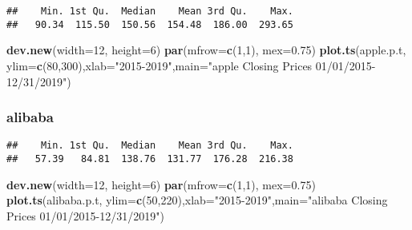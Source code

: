 \documentclass[]{article}
\newenvironment{Shaded}{\begin{snugshade}}{\end{snugshade}}
\newcommand{\KeywordTok}[1]{\textcolor[rgb]{0.13,0.29,0.53}{\textbf{#1}}}
\newcommand{\DataTypeTok}[1]{\textcolor[rgb]{0.13,0.29,0.53}{#1}}
\newcommand{\DecValTok}[1]{\textcolor[rgb]{0.00,0.00,0.81}{#1}}
\newcommand{\FloatTok}[1]{\textcolor[rgb]{0.00,0.00,0.81}{#1}}
\newcommand{\StringTok}[1]{\textcolor[rgb]{0.31,0.60,0.02}{#1}}
\newcommand{\OperatorTok}[1]{\textcolor[rgb]{0.81,0.36,0.00}{\textbf{#1}}}
\newcommand{\NormalTok}[1]{#1}
\begin{document}
\begin{verbatim}
##    Min. 1st Qu.  Median    Mean 3rd Qu.    Max. 
##   90.34  115.50  150.56  154.48  186.00  293.65
\end{verbatim}

\begin{Shaded}
\begin{Highlighting}[]
\KeywordTok{dev.new}\NormalTok{(}\DataTypeTok{width=}\DecValTok{12}\NormalTok{, }\DataTypeTok{height=}\DecValTok{6}\NormalTok{)}
\KeywordTok{par}\NormalTok{(}\DataTypeTok{mfrow=}\KeywordTok{c}\NormalTok{(}\DecValTok{1}\NormalTok{,}\DecValTok{1}\NormalTok{), }\DataTypeTok{mex=}\FloatTok{0.75}\NormalTok{)}
\KeywordTok{plot.ts}\NormalTok{(apple.p.t, }\DataTypeTok{ylim=}\KeywordTok{c}\NormalTok{(}\DecValTok{80}\NormalTok{,}\DecValTok{300}\NormalTok{),}\DataTypeTok{xlab=}\StringTok{"2015-2019"}\NormalTok{,}\DataTypeTok{main=}\StringTok{"apple Closing Prices 01/01/2015-12/31/2019"}\NormalTok{)}
\end{Highlighting}
\end{Shaded}

\subsubsection{alibaba}\label{alibaba}

\begin{Shaded}
\end{Shaded}

\begin{verbatim}
##    Min. 1st Qu.  Median    Mean 3rd Qu.    Max. 
##   57.39   84.81  138.76  131.77  176.28  216.38
\end{verbatim}

\begin{Shaded}
\begin{Highlighting}[]
\KeywordTok{dev.new}\NormalTok{(}\DataTypeTok{width=}\DecValTok{12}\NormalTok{, }\DataTypeTok{height=}\DecValTok{6}\NormalTok{)}
\KeywordTok{par}\NormalTok{(}\DataTypeTok{mfrow=}\KeywordTok{c}\NormalTok{(}\DecValTok{1}\NormalTok{,}\DecValTok{1}\NormalTok{), }\DataTypeTok{mex=}\FloatTok{0.75}\NormalTok{)}
\KeywordTok{plot.ts}\NormalTok{(alibaba.p.t, }\DataTypeTok{ylim=}\KeywordTok{c}\NormalTok{(}\DecValTok{50}\NormalTok{,}\DecValTok{220}\NormalTok{),}\DataTypeTok{xlab=}\StringTok{"2015-2019"}\NormalTok{,}\DataTypeTok{main=}\StringTok{"alibaba Closing Prices 01/01/2015-12/31/2019"}\NormalTok{)}
\end{Highlighting}
\end{Shaded}
\end{document}
